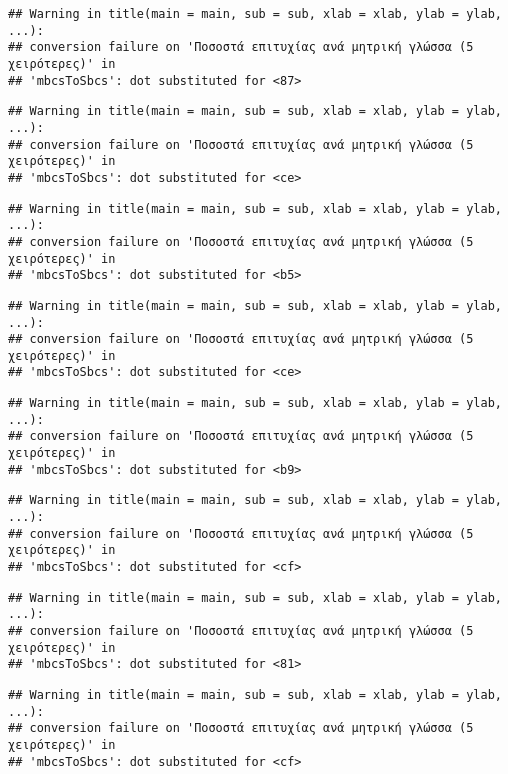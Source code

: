 \documentclass[
]{article}
\begin{document}
\begin{verbatim}
## Warning in title(main = main, sub = sub, xlab = xlab, ylab = ylab, ...):
## conversion failure on 'Ποσοστά επιτυχίας ανά μητρική γλώσσα (5 χειρότερες)' in
## 'mbcsToSbcs': dot substituted for <87>
\end{verbatim}

\begin{verbatim}
## Warning in title(main = main, sub = sub, xlab = xlab, ylab = ylab, ...):
## conversion failure on 'Ποσοστά επιτυχίας ανά μητρική γλώσσα (5 χειρότερες)' in
## 'mbcsToSbcs': dot substituted for <ce>
\end{verbatim}

\begin{verbatim}
## Warning in title(main = main, sub = sub, xlab = xlab, ylab = ylab, ...):
## conversion failure on 'Ποσοστά επιτυχίας ανά μητρική γλώσσα (5 χειρότερες)' in
## 'mbcsToSbcs': dot substituted for <b5>
\end{verbatim}

\begin{verbatim}
## Warning in title(main = main, sub = sub, xlab = xlab, ylab = ylab, ...):
## conversion failure on 'Ποσοστά επιτυχίας ανά μητρική γλώσσα (5 χειρότερες)' in
## 'mbcsToSbcs': dot substituted for <ce>
\end{verbatim}

\begin{verbatim}
## Warning in title(main = main, sub = sub, xlab = xlab, ylab = ylab, ...):
## conversion failure on 'Ποσοστά επιτυχίας ανά μητρική γλώσσα (5 χειρότερες)' in
## 'mbcsToSbcs': dot substituted for <b9>
\end{verbatim}

\begin{verbatim}
## Warning in title(main = main, sub = sub, xlab = xlab, ylab = ylab, ...):
## conversion failure on 'Ποσοστά επιτυχίας ανά μητρική γλώσσα (5 χειρότερες)' in
## 'mbcsToSbcs': dot substituted for <cf>
\end{verbatim}

\begin{verbatim}
## Warning in title(main = main, sub = sub, xlab = xlab, ylab = ylab, ...):
## conversion failure on 'Ποσοστά επιτυχίας ανά μητρική γλώσσα (5 χειρότερες)' in
## 'mbcsToSbcs': dot substituted for <81>
\end{verbatim}

\begin{verbatim}
## Warning in title(main = main, sub = sub, xlab = xlab, ylab = ylab, ...):
## conversion failure on 'Ποσοστά επιτυχίας ανά μητρική γλώσσα (5 χειρότερες)' in
## 'mbcsToSbcs': dot substituted for <cf>
\end{verbatim}
\end{document}
